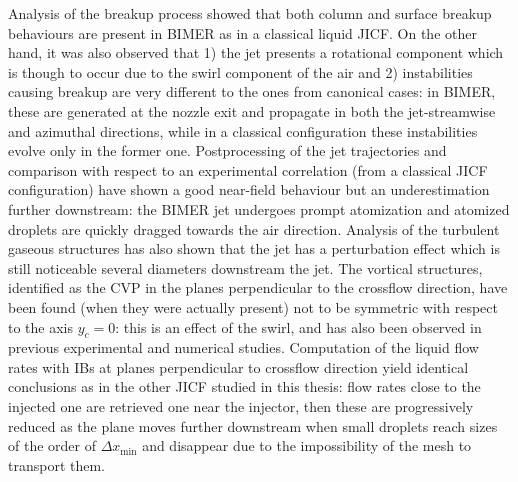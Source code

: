  Analysis of the breakup process showed that both column and surface breakup behaviours are present in BIMER as in a classical liquid JICF. On the other hand, it was also observed that 1) the jet presents a rotational component which is though to occur due to the swirl component of the air and 2) instabilities causing breakup are very different to the ones from canonical cases: in BIMER, these are generated at the nozzle exit and propagate in both the jet-streamwise and azimuthal directions, while in a classical configuration these instabilities evolve only in the former one. Postprocessing of the jet trajectories and comparison with respect to an experimental correlation (from a classical JICF configuration) have shown a good near-field behaviour but an underestimation further downstream: the BIMER jet undergoes prompt atomization and atomized droplets are quickly dragged towards the air direction. Analysis of the turbulent gaseous structures has also shown that the jet has a perturbation effect which is still noticeable several diameters downstream the jet. The vortical structures, identified as the CVP in the planes perpendicular to the crossflow direction, have been found (when they were actually present) not to be symmetric with respect to the axis $y_c = 0$: this is an effect of the swirl, and has also been observed in previous experimental and numerical studies. Computation of the liquid flow rates with IBs at planes perpendicular to crossflow direction yield identical conclusions as in the other JICF studied in this thesis: flow rates close to the injected one are retrieved one near the injector, then these are progressively reduced as the plane moves further downstream when small droplets reach sizes of the order of  $\Delta x_\mathrm{min}$ and disappear due to the impossibility of the mesh to transport them.
